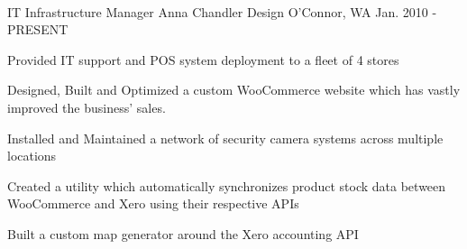 
 \

\begin{cventries}

  \cventry
    {IT Infrastructure Manager} %
    {Anna Chandler Design} %
    {O'Connor, WA} %
    {Jan. 2010 - PRESENT} %
    {
      \begin{cvitems} %
        \item {Provided IT support and POS system deployment to a fleet of 4 stores}
        \item {Designed, Built and Optimized a custom WooCommerce website which has vastly improved the business’ sales.}
        \item {Installed and Maintained a network of security camera systems across multiple locations}
        \item {Created a utility which automatically synchronizes product stock data between WooCommerce and Xero using their respective APIs}
        \item {Built a custom map generator around the Xero accounting API}
      \end{cvitems}
    }


\end{cventries}
